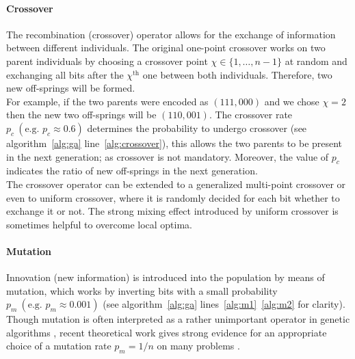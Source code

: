 \documentclass[12pt]{article}
\begin{document}
\paragraph{Crossover}
The recombination (crossover) operator allows for the
exchange of information between different individuals.
The original one-point crossover \cite{holland} works on two parent individuals
by choosing a crossover point $ \chi \in \{1, \dots, n-1 \} $
at random and exchanging all bits after the $ \chi^{\text{th}} $ one
between both individuals.
Therefore, two new off-springs will be formed.\\
For example, if the two parents were encoded as $(111, 000)$ and we chose $\chi = 2$
then the new two off-springs will be $(110, 001)$.
The crossover rate $ p_c \ (\text{e.g. } p_c \approx 0.6) $
determines the probability to undergo crossover (see algorithm~\ref{alg:ga} line~\ref{alg:crossover}),
this allows the two parents to be present in the next generation; as crossover is not mandatory.
Moreover, the value of $p_c$ indicates the ratio of new off-springs in the next generation.\\
The crossover operator can be extended to a generalized
multi-point crossover or even to uniform crossover,
where it is randomly decided for each bit
whether to exchange it or not.
The strong mixing effect introduced by uniform crossover
is sometimes helpful to overcome local optima.

\paragraph{Mutation}
Innovation (new information) is introduced into the
population by means of mutation, which works by inverting
bits with a small probability $p_m \ (\text{e.g. } p_m \approx 0.001)$
(see algorithm~\ref{alg:ga} lines~\ref{alg:m1}~\ref{alg:m2} for clarity).
Though mutation is often interpreted as a rather unimportant operator
in genetic algorithms \cite{holland}, recent theoretical
work gives strong evidence for an appropriate choice of a
mutation rate $ p_m = 1/n $ on many problems \cite{2:misp, 12:misp}.
\end{document}
